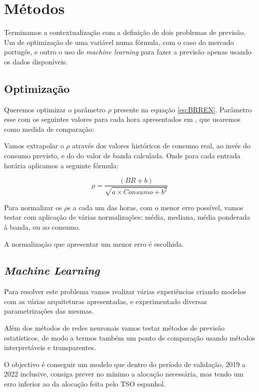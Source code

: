 \section{Métodos}

Terminamos a contextualização com a definição de dois problemas de previsão. Um de optimização de uma variável numa fórmula, com o caso do mercado portugês, e outro o uso de \textit{machine learning} para fazer a previsão apenas usando os dados disponíveis.\par

\subsection{Optimização}

Queremos optimizar o parâmetro $\rho$ presente na equação \ref{eq:BRREN}. Parâmetro esse com os seguintes valores para cada hora apresentados em \cite{Carneiro2016}, que usaremos como medida de comparação:\par
\begin{table}[H] \centering \caption{Valores de $\rho$ apresentado em \cite{Carneiro2016}}  \end{table}

Vamos extrapolar o $\rho$ através dos valores históricos de consumo real, ao invés do consumo previsto, e do do valor de banda calculada. Onde para cada entrada horária aplicamos a seguinte fórmula:\par
\begin{equation} \label{eq:rhoproposed} 
    \rho  = \frac{(BR + b)}{\sqrt{a \times Consumo + b^{2}}}
\end{equation}

Para normalizar os $\rho$s a cada um das horas, com o menor erro possível, vamos testar com aplicação de várias normalizações: média, mediana, média ponderada à banda, ou ao consumo.\par
A normalização que apresentar um menor erro é escolhida.\par


\subsection{\textit{Machine Learning}}

Para resolver este problema vamos realizar várias experiências criando modelos com as várias arquiteturas apresentadas, e experimentado diversas parametrizações das mesmas.\par
Além dos métodos de redes neuronais vamos testar métodos de previsão estatísticos, de modo a termos também um ponto de comparação usando métodos interpretáveis e transparentes.\par
O objectivo é conseguir um modelo que dentro do período de validação, 2019 a 2022 inclusive, consiga prever no mínimo a alocação necessária, mas tendo um erro inferior ao da alocação feita pelo \gls{TSO} espanhol.\par


\thispagestyle{plain}
 \label{se:metstats}


\newpage
\thispagestyle{plain}
 \label{se:metneuralnet}

% 

